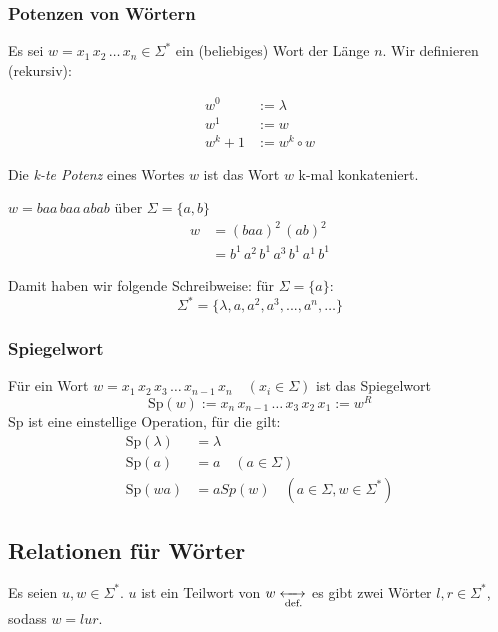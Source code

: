 \documentclass[runningheads,deutsch]{llncs}
\begin{document}
\subsubsection{Potenzen von Wörtern}
Es sei $w = x_1\, x_2 \, \dots \, x_n \in \Sigma^*$ ein (beliebiges) Wort der Länge $n$. Wir definieren (rekursiv):

\begin{align}
    w^0 &:= \lambda \\
    w^1 &:= w \\
    w^k+1 &:= w^k \circ w
\end{align}

Die \textit{k-te Potenz} eines Wortes $w$ ist das Wort $w$ k-mal konkateniert.

\begin{example}
    $w = baa\, baa\, abab$ über $\Sigma = \{a, b\}$
    \begin{align*}
        w &= (baa)^2 \, (ab)^2 \\
        &= b^1\, a^2 \, b^1\, a^3\, b^1\, a^1\, b^1
    \end{align*}
\end{example}

Damit haben wir folgende Schreibweise: für $\Sigma = \{a\}$:
\[ \Sigma^* = \{\lambda, a, a^2, a^3, ..., a^n, \dots \} \]

\subsubsection{Spiegelwort}

Für ein Wort $w = x_1\, x_2\, x_3\, \dots \, x_{n-1}\, x_n \quad (x_i \in \Sigma)$ ist das Spiegelwort
\[ \text{Sp}(w) := x_n\, x_{n-1}\, \dots \, x_3\, x_2\, x_1 := w^R \]
Sp ist eine einstellige Operation, für die gilt:
\begin{align}
    \text{Sp}(\lambda) &= \lambda \\
    \text{Sp}(a) &= a \quad (a \in \Sigma) \\
    \text{Sp}(wa) &= a Sp(w) \quad (a \in \Sigma, w \in \Sigma^*)
\end{align}

\subsection{Relationen für Wörter}

\begin{definition}
    Es seien $u, w \in \Sigma^*$. $u$ ist ein Teilwort von $w \xleftrightarrow[\text{def.}]{}$ es gibt zwei Wörter $l, r \in \Sigma^*$, sodass $w=lur$.
\end{definition}
\end{document}

